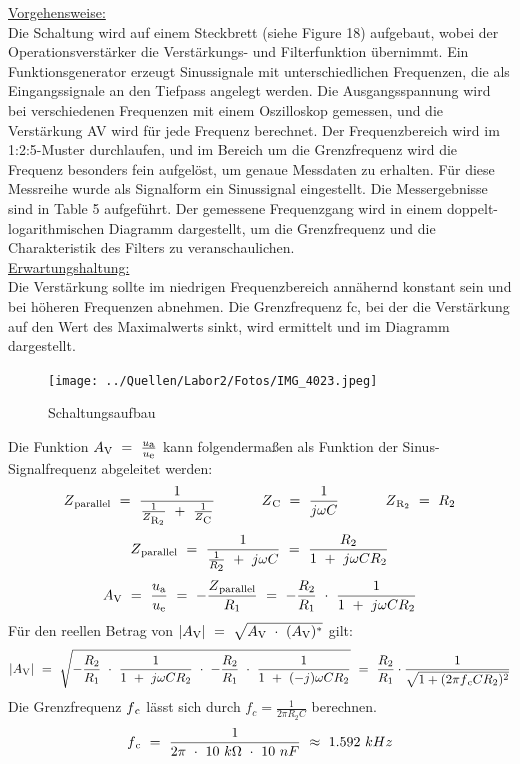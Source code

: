 \documentclass[a4paper,12pt]{article}
\begin{document}
\noindent \underline{Vorgehensweise:}\\
\noindent Die Schaltung wird auf einem Steckbrett (siehe Figure 18) aufgebaut, wobei der Operationsverstärker die Verstärkungs- und Filterfunktion übernimmt.
Ein Funktionsgenerator erzeugt Sinussignale mit unterschiedlichen Frequenzen, die als Eingangssignale an den Tiefpass angelegt werden.
Die Ausgangsspannung wird bei verschiedenen Frequenzen mit einem Oszilloskop gemessen, und die Verstärkung AV wird für jede Frequenz berechnet.
Der Frequenzbereich wird im 1:2:5-Muster durchlaufen, und im Bereich um die Grenzfrequenz wird die Frequenz besonders fein aufgelöst, um genaue Messdaten zu erhalten. Für diese Messreihe wurde als Signalform ein Sinussignal eingestellt. Die Messergebnisse sind in Table 5 aufgeführt.
Der gemessene Frequenzgang wird in einem doppelt-logarithmischen Diagramm dargestellt, um die Grenzfrequenz und die Charakteristik des Filters zu veranschaulichen.\\

\noindent \underline{Erwartungshaltung:}\\
\noindent Die Verstärkung sollte im niedrigen Frequenzbereich annähernd konstant sein und bei höheren Frequenzen abnehmen.
Die Grenzfrequenz fc, bei der die Verstärkung auf den Wert des Maximalwerts sinkt, wird ermittelt und im Diagramm dargestellt.

\begin{figure}[H]
    \centering
    \texttt{[image: ../Quellen/Labor2/Fotos/IMG\_4023.jpeg]}
\caption{Schaltungsaufbau}
\end{figure}
\noindent Die Funktion \(A\textsubscript{V}~=~\frac{u\textsubscript{a}}{u\textsubscript{e}}\) kann folgendermaßen als Funktion der Sinus-Signalfrequenz abgeleitet werden:
\[
Z\textsubscript{parallel}~=~\frac{1}{\frac{1}{Z\textsubscript{R\textsubscript{2}}}~+~\frac{1}{Z\textsubscript{C}}}~~~~~~~~~~Z\textsubscript{C}~=~\frac{1}{j\omega C}~~~~~~~~~~Z\textsubscript{R\textsubscript{2}}~=~R\textsubscript{2}
\]
\[
Z\textsubscript{parallel}~=~\frac{1}{\frac{1}{R\textsubscript{2}}~+~j\omega C}~=~\frac{R\textsubscript{2}}{1~+~j\omega CR\textsubscript{2}}
\]
\[
A\textsubscript{V}~=~\frac{u\textsubscript{a}}{u\textsubscript{e}}~=~-\frac{Z\textsubscript{parallel}}{R_1}~=~-\frac{R_2}{R_1}~\cdot~\frac{1}{1~+~j\omega CR\textsubscript{2}}
\]
\noindent Für den reellen Betrag von \(\left\lvert A\textsubscript{V}\right\rvert~=~\sqrt{A\textsubscript{V}~\cdot~(A\textsubscript{V})^*}\) gilt:
\[
\left\lvert A\textsubscript{V}\right\rvert~=~\sqrt{-\frac{R_2}{R_1}~\cdot~\frac{1}{1~+~j\omega CR\textsubscript{2}}~\cdot~-\frac{R_2}{R_1}~\cdot~\frac{1}{1~+~(-j)\omega CR\textsubscript{2}}}~=~\frac{R_2}{R_1}\cdot\frac{1}{\sqrt{1+(2\pi f\textsubscript{c} CR_2)^2}}
\]
\noindent Die Grenzfrequenz \(f\textsubscript{c}\) lässt sich durch \(f_c = \frac{1}{2 \pi R_2 C}\) berechnen.
\[
f\textsubscript{c}~=~\frac{1}{2 \pi~\cdot~10~k\Omega~\cdot~10~nF}~\approx~1.592~kHz
\]
\end{document}
